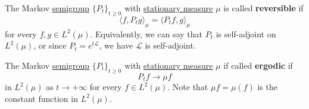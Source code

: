   \begin{definition}[Reversibility]
    \label{def:reversibility}
  The Markov \hyperref[alg-def:semigroup]{semigroup} $\{P_t\}_{t \geq 0}$ with \hyperref[def:stationary-measure]{stationary measure} $\mu$ is called \textbf{reversible} if 
  \begin{equation}
    \langle f, P_t g \rangle_\mu = \langle P_t f, g \rangle_\mu
  \end{equation}
  for every $f, g \in L^2 (\mu)$. Equivalently, we can say that $P_t$ is self-adjoint on $L^2 (\mu)$, or since $P_t = e^{t \mathscr{L}}$, we have $\mathscr{L}$ is self-adjoint. 
  \end{definition}

  \begin{definition}[Ergodicity]
    \label{def:ergodicity}
  The Markov \hyperref[alg-def:semigroup]{semigroup} $\{P_t\}_{t \geq 0}$ with \hyperref[def:stationary-measure]{stationary measure} $\mu$ if called \textbf{ergodic} if 
  \begin{equation}
    P_t f \rightarrow \mu f
  \end{equation}
  in $L^2 (\mu)$ as $t \rightarrow +\infty$ for every $f \in L^2 (\mu)$. Note that $\mu f = \mu(f)$ is the constant function in $L^2 (\mu)$. 
  \end{definition}

